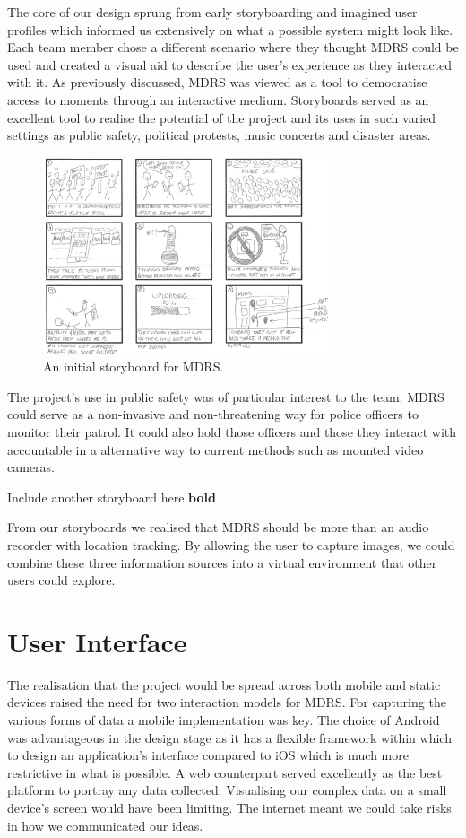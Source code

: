 \documentclass{l3proj}
\begin{document}
The core of our design sprung from early storyboarding and imagined user
profiles which informed us extensively on what a possible system might look
like. Each team member chose a different scenario where they thought MDRS could be used and created a visual aid to describe the user's experience as they interacted with it. As previously discussed, MDRS was viewed as a tool to democratise access to moments through an interactive medium. Storyboards served as an excellent tool to realise the potential of the project and its uses in such varied settings as public safety, political protests, music concerts and disaster areas.

\begin{figure}[ht!]
\centering
\includegraphics[width=0.75\textwidth]{images/ally-storyboard.jpg}
\caption{An initial storyboard for MDRS.}
\end{figure}

The project's use in public safety was of particular interest to the team. MDRS could serve as a non-invasive and non-threatening way for police officers to monitor their patrol. It could also hold those officers and those they interact with accountable in a alternative way to current methods such as mounted video cameras.

Include another storyboard here {\bf bold}

From our storyboards we realised that MDRS should be more than an audio recorder with location tracking. By allowing the user to capture images, we could combine these three information sources into a virtual environment that other users could explore.

\section{User Interface} The realisation that the project would be spread across
both mobile and static devices raised the need for two interaction models for
MDRS. For capturing the various forms of data a mobile implementation was key. The choice of Android was advantageous in the design stage as it has a flexible framework within which to design an application's interface compared to iOS which is much more restrictive in what is possible. A web counterpart served excellently as the best platform to portray any data collected. Visualising our complex data on a small device's screen would have been limiting. The internet meant we could take risks in how we communicated our ideas.
\end{document}
